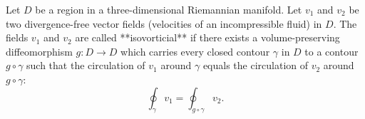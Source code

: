 Let $D$ be a region in a three-dimensional Riemannian manifold. Let $v_1$ and $v_2$ be two divergence-free vector fields (velocities of an incompressible fluid) in $D$. The fields $v_1$ and $v_2$ are called **isovorticial** if there exists a volume-preserving diffeomorphism $g: D \to D$ which carries every closed contour $\gamma$ in $D$ to a contour $g \circ \gamma$ such that the circulation of $v_1$ around $\gamma$ equals the circulation of $v_2$ around $g \circ \gamma$:
$$\oint_{\gamma} v_1 = \oint_{g \circ \gamma} v_2.$$
